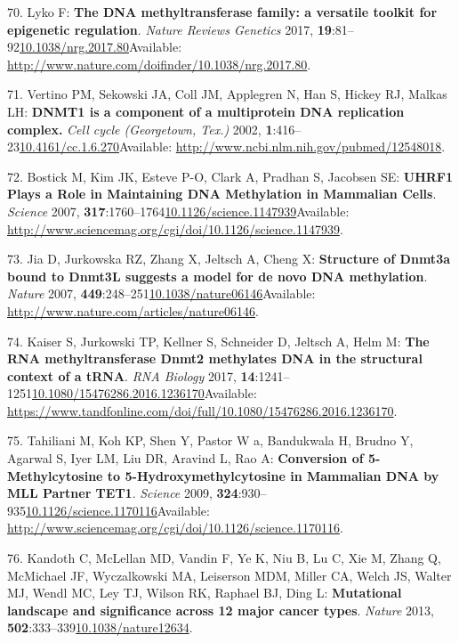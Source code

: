 \documentclass[
]{book}
\begin{document}
\leavevmode\hypertarget{ref-Lyko2017}{}%
70. Lyko F: \textbf{The DNA methyltransferase family: a versatile toolkit for epigenetic regulation}. \emph{Nature Reviews Genetics} 2017, \textbf{19}:81--92\href{https://doi.org/10.1038/nrg.2017.80}{10.1038/nrg.2017.80}Available: \url{http://www.nature.com/doifinder/10.1038/nrg.2017.80}.

\leavevmode\hypertarget{ref-Vertino2002}{}%
71. Vertino PM, Sekowski JA, Coll JM, Applegren N, Han S, Hickey RJ, Malkas LH: \textbf{DNMT1 is a component of a multiprotein DNA replication complex.} \emph{Cell cycle (Georgetown, Tex.)} 2002, \textbf{1}:416--23\href{https://doi.org/10.4161/cc.1.6.270}{10.4161/cc.1.6.270}Available: \url{http://www.ncbi.nlm.nih.gov/pubmed/12548018}.

\leavevmode\hypertarget{ref-Bostick2007}{}%
72. Bostick M, Kim JK, Esteve P-O, Clark A, Pradhan S, Jacobsen SE: \textbf{UHRF1 Plays a Role in Maintaining DNA Methylation in Mammalian Cells}. \emph{Science} 2007, \textbf{317}:1760--1764\href{https://doi.org/10.1126/science.1147939}{10.1126/science.1147939}Available: \url{http://www.sciencemag.org/cgi/doi/10.1126/science.1147939}.

\leavevmode\hypertarget{ref-Jia2009}{}%
73. Jia D, Jurkowska RZ, Zhang X, Jeltsch A, Cheng X: \textbf{Structure of Dnmt3a bound to Dnmt3L suggests a model for de novo DNA methylation}. \emph{Nature} 2007, \textbf{449}:248--251\href{https://doi.org/10.1038/nature06146}{10.1038/nature06146}Available: \url{http://www.nature.com/articles/nature06146}.

\leavevmode\hypertarget{ref-Kaiser2017}{}%
74. Kaiser S, Jurkowski TP, Kellner S, Schneider D, Jeltsch A, Helm M: \textbf{The RNA methyltransferase Dnmt2 methylates DNA in the structural context of a tRNA}. \emph{RNA Biology} 2017, \textbf{14}:1241--1251\href{https://doi.org/10.1080/15476286.2016.1236170}{10.1080/15476286.2016.1236170}Available: \url{https://www.tandfonline.com/doi/full/10.1080/15476286.2016.1236170}.

\leavevmode\hypertarget{ref-Tahiliani2009}{}%
75. Tahiliani M, Koh KP, Shen Y, Pastor W a, Bandukwala H, Brudno Y, Agarwal S, Iyer LM, Liu DR, Aravind L, Rao A: \textbf{Conversion of 5-Methylcytosine to 5-Hydroxymethylcytosine in Mammalian DNA by MLL Partner TET1}. \emph{Science} 2009, \textbf{324}:930--935\href{https://doi.org/10.1126/science.1170116}{10.1126/science.1170116}Available: \url{http://www.sciencemag.org/cgi/doi/10.1126/science.1170116}.

\leavevmode\hypertarget{ref-Kandoth2013}{}%
76. Kandoth C, McLellan MD, Vandin F, Ye K, Niu B, Lu C, Xie M, Zhang Q, McMichael JF, Wyczalkowski MA, Leiserson MDM, Miller CA, Welch JS, Walter MJ, Wendl MC, Ley TJ, Wilson RK, Raphael BJ, Ding L: \textbf{Mutational landscape and significance across 12 major cancer types}. \emph{Nature} 2013, \textbf{502}:333--339\href{https://doi.org/10.1038/nature12634}{10.1038/nature12634}.
\end{document}

